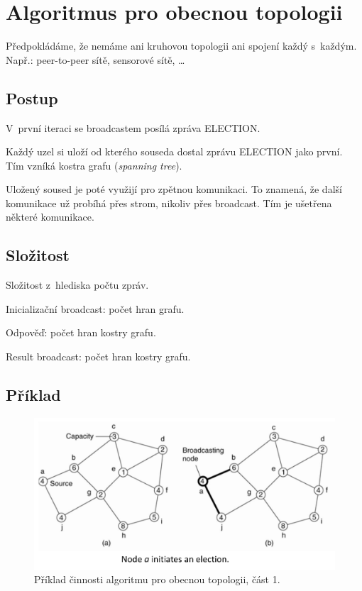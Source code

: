 
\section{Algoritmus pro obecnou topologii}

Předpokládáme, že nemáme ani kruhovou topologii ani spojení každý s~každým. Např.: peer-to-peer sítě, sensorové sítě, \dots

\subsection*{Postup}

\begin{compactitem}
    \item V~první iteraci se broadcastem posílá zpráva ELECTION.
    \item Každý uzel si uloží od kterého souseda dostal zprávu ELECTION jako první. Tím vzníká kostra grafu (\textit{spanning tree}).
    \item Uložený soused je poté využijí pro zpětnou komunikaci. To znamená, že další komunikace už probíhá přes strom, nikoliv přes broadcast. Tím je ušetřena některé komunikace.
\end{compactitem}

\subsection*{Složitost}

Složitost z~hlediska počtu zpráv.

\begin{compactitem}
    \item Inicializační broadcast: počet hran grafu.
    \item Odpověď: počet hran kostry grafu.
    \item Result broadcast: počet hran kostry grafu.
\end{compactitem}

\subsection*{Příklad}

\begin{figure}[H]
    \centering
    \includegraphics[width=1\linewidth]{example_general_topology_p1.pdf}
    \caption{Příklad činnosti algoritmu pro obecnou topologii, část 1.}
\end{figure}

